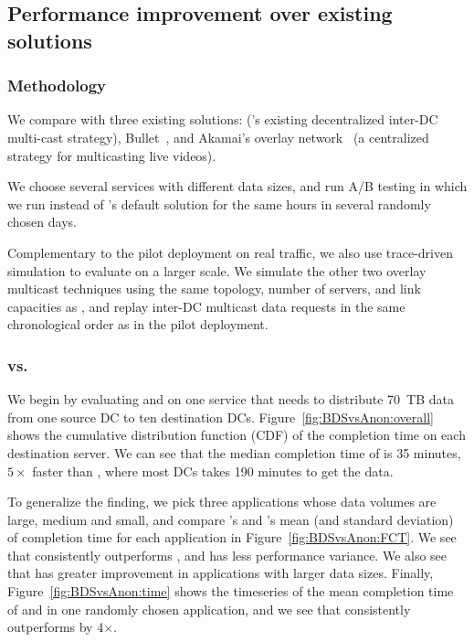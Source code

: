 \subsection{Performance improvement over existing solutions}
\label{subsec:evaluation:centralized}

\subsubsection{Methodology}

We compare \name with three existing solutions: \alg (\company's
existing decentralized inter-DC multi-cast strategy),
Bullet~\cite{kostic2003bullet}, and Akamai's overlay
network~\cite{Andreev2013Designing} (a centralized strategy for
multicasting live videos).


We choose several services with different data sizes, and run
A/B testing in which we run \name instead of \company's default
solution \alg for the same hours in several randomly chosen days.

Complementary to the pilot deployment on real traffic, we also use
trace-driven simulation to evaluate \name on a larger scale.
We simulate the other two overlay multicast techniques using the
same topology, number of servers, and link capacities as \name, and
replay inter-DC multicast data requests in the same chronological
order as in the pilot deployment.

\subsubsection{\name vs. \alg}
\label{subsubsec:name-vs-alg}

We begin by evaluating \name and \alg on one service that needs to
distribute 70~TB data from one source DC to ten destination DCs.
Figure~\ref{fig:BDSvsAnon:overall} shows the cumulative distribution
function (CDF) of the completion time on each destination server. We can
see that the median completion time of \name is 35 minutes,
$5\times$ faster than \alg, where most DCs takes 190 minutes to
get the data.

To generalize the finding, we pick three applications whose data
volumes are large, medium and small, and compare \name's and \alg's
mean (and standard deviation) of completion time for each application
in Figure~\ref{fig:BDSvsAnon:FCT}.
We see that \name consistently outperforms \alg, and has less
performance variance. We also see that \name has greater improvement
in applications with larger data sizes. Finally,
Figure~\ref{fig:BDSvsAnon:time} shows the timeseries of the mean
completion time of \name and \alg in one randomly chosen application,
and we see that \name consistently outperforms \alg by 4$\times$.

